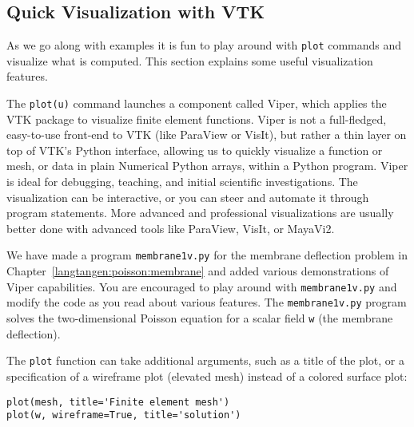 \subsection{Quick Visualization with VTK}
\label{langtangen:quickviz}
As we go along with examples it is fun to play around with
{\fontsize{12pt}{12pt}\texttt{plot}} commands and visualize what is computed. This section explains
some useful visualization features.

The {\fontsize{12pt}{12pt}\verb!plot(u)!} command launches a \fenics{} component called Viper, which
applies the VTK package to visualize finite element functions.
Viper is not a full-fledged, easy-to-use front-end to VTK (like ParaView
or VisIt), but rather a thin layer on top of VTK's Python interface,
allowing us to quickly visualize a \dolfin{} function or mesh, or data in
plain Numerical Python arrays, within a Python program. 
Viper is ideal for debugging, teaching, and initial scientific investigations.
The visualization can be interactive, or you can steer and automate it
through program statements.
More advanced and professional visualizations are usually better done with
advanced tools like ParaView, VisIt, or MayaVi2.

We have made a program {\fontsize{12pt}{12pt}\texttt{membrane1v.py}} for the membrane deflection
problem in Chapter~\ref{langtangen:poisson:membrane} and added various
demonstrations of Viper capabilities. You are encouraged to play around with
{\fontsize{12pt}{12pt}\texttt{membrane1v.py}} and modify the code as you read about various features.
The {\fontsize{12pt}{12pt}\texttt{membrane1v.py}} program solves the two-dimensional Poisson
equation for a scalar field {\fontsize{12pt}{12pt}\texttt{w}} (the membrane deflection).

The {\fontsize{12pt}{12pt}\texttt{plot}} function can take additional arguments, such as
a title of the plot, or a specification of a wireframe plot (elevated mesh)
instead of a colored surface plot:
\begin{Verbatim}[fontsize=\fontsize{10pt}{10pt},tabsize=8,baselinestretch=1.05,
fontfamily=tt,xleftmargin=7mm]
plot(mesh, title='Finite element mesh')
plot(w, wireframe=True, title='solution')
\end{Verbatim}
\noindent


